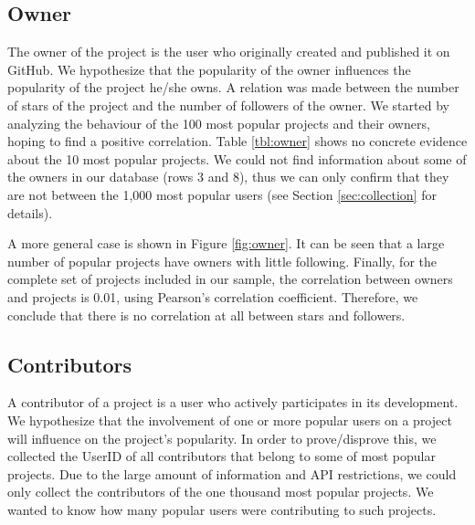 \subsection{Owner}

The owner of the project is the user who originally created and published it on GitHub. We hypothesize that the popularity of the owner influences the popularity of the project he/she owns. A relation was made between the number of stars of the project and the number of followers of the owner. We started by analyzing the behaviour of the 100 most popular projects and their owners, hoping to find a positive correlation. Table \ref{tbl:owner} shows no concrete evidence about the 10 most popular projects. We could not find information about some of the owners in our database (rows 3 and 8), thus we can only confirm that they are not between the 1,000 most popular users (see Section \ref{sec:collection} for details).

A more general case is shown in Figure \ref{fig:owner}. It can be seen that a large number of popular projects have owners with little following. Finally, for the complete set of projects included in our sample, the correlation between owners and projects is 0.01, using Pearson's correlation coefficient. Therefore, we conclude that there is no correlation at all between stars and followers.

\subsection{Contributors}

A contributor of a project is a user who actively participates in its development. We hypothesize that the involvement of one or more popular users on a project will influence on the project's popularity. In order to prove/disprove this, we collected the UserID of all contributors that belong to some of most popular projects. Due to the large amount of information and API restrictions, we could only collect the contributors of the one thousand most popular projects. We wanted to know how many popular users were contributing to such projects.

